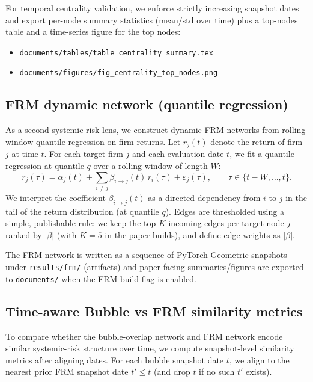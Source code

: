 For temporal centrality validation, we enforce strictly increasing snapshot dates and export per-node summary statistics (mean/std over time) plus a top-nodes table and a time-series figure for the top nodes:
\begin{itemize}
  \item \texttt{documents/tables/table\_centrality\_summary.tex}
  \item \texttt{documents/figures/fig\_centrality\_top\_nodes.png}
\end{itemize}

\subsection{FRM dynamic network (quantile regression)}

As a second systemic-risk lens, we construct dynamic FRM networks from rolling-window quantile regression on firm returns.
Let $r_j(t)$ denote the return of firm $j$ at time $t$.
For each target firm $j$ and each evaluation date $t$, we fit a quantile regression at quantile $q$ over a rolling window of length $W$:
\begin{equation}
  r_j(\tau) = \alpha_j(t) + \sum_{i \neq j} \beta_{i \rightarrow j}(t) \, r_i(\tau) + \varepsilon_j(\tau), \qquad \tau \in \{t-W,\dots,t\}.
\end{equation}
We interpret the coefficient $\beta_{i \rightarrow j}(t)$ as a directed dependency from $i$ to $j$ in the tail of the return distribution (at quantile $q$).
Edges are thresholded using a simple, publishable rule: we keep the top-$K$ incoming edges per target node $j$ ranked by $|\beta|$ (with $K=5$ in the paper builds), and define edge weights as $|\beta|$.

The FRM network is written as a sequence of PyTorch Geometric snapshots under \texttt{results/frm/} (artifacts) and paper-facing summaries/figures are exported to \texttt{documents/} when the FRM build flag is enabled.

\subsection{Time-aware Bubble vs FRM similarity metrics}

To compare whether the bubble-overlap network and FRM network encode similar systemic-risk structure over time, we compute snapshot-level similarity metrics after aligning dates.
For each bubble snapshot date $t$, we align to the nearest prior FRM snapshot date $t' \le t$ (and drop $t$ if no such $t'$ exists).

